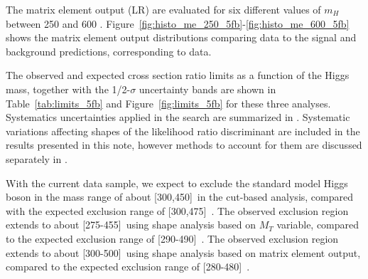 The matrix element output (LR) are evaluated for six different values of $m_H$ between 250 and 600 \GeVcc.
Figure~\ref{fig:histo_me_250_5fb}-\ref{fig:histo_me_600_5fb} shows the matrix element output distributions 
comparing data to the signal and background predictions, corresponding to \intlumi data.

The observed and expected cross section ratio limits as a function of the Higgs mass, together with the 1/2-$\sigma$ uncertainty bands 
are shown in Table~\ref{tab:limits_5fb} and Figure~\ref{fig:limits_5fb} for these three analyses. 
Systematics uncertainties applied in the search are summarized in \cite{ref:HZZ2011smurf}.
Systematic variations affecting shapes of the likelihood ratio discriminant are included in the results presented in this note,
however methods to account for them are discussed separately in \cite{ref:ShapeSmurf}. 


With the current data sample, we expect to exclude the standard model Higgs boson 
in the mass range of about [300,450]~\GeVcc in the cut-based analysis, compared with the 
expected exclusion range of [300,475]~\GeVcc. 
The observed exclusion region extends to about [275-455]~\GeVcc using shape analysis based on 
$M_T$ variable, compared to the expected exclusion range of [290-490]~\GeVcc.
The observed exclusion region extends to about [300-500]~\GeVcc using shape analysis based on 
matrix element output, compared to the expected exclusion range of [280-480]~\GeVcc.

